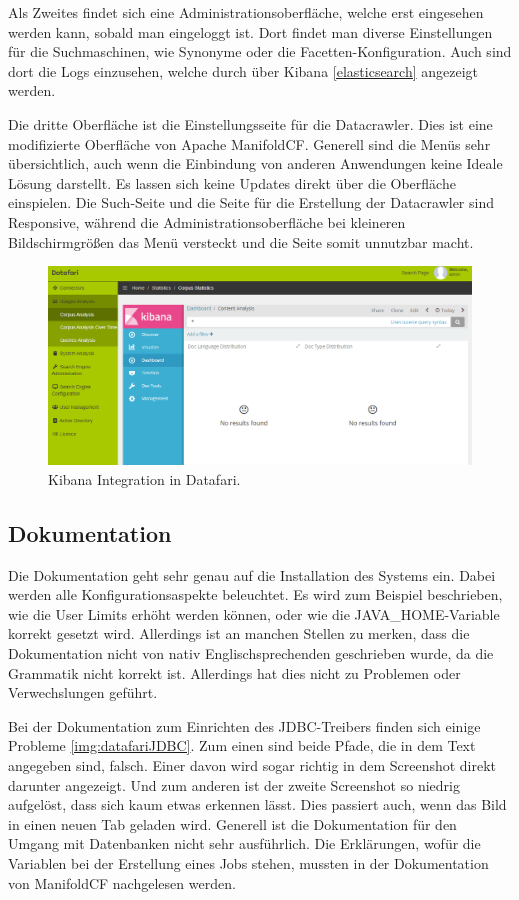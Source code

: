 Als Zweites findet sich eine Administrationsoberfläche, welche erst eingesehen werden kann, sobald man eingeloggt ist. Dort findet man diverse Einstellungen für die Suchmaschinen, wie Synonyme oder die Facetten-Konfiguration. Auch sind dort die Logs einzusehen, welche durch über Kibana \ref{elasticsearch} angezeigt werden. 

Die dritte Oberfläche ist die Einstellungsseite für die Datacrawler. Dies ist eine modifizierte Oberfläche von Apache ManifoldCF. Generell sind die Menüs sehr übersichtlich, auch wenn die Einbindung von anderen Anwendungen keine Ideale Lösung darstellt. Es lassen sich keine Updates direkt über die Oberfläche einspielen.
Die Such-Seite und die Seite für die Erstellung der Datacrawler sind Responsive, während die Administrationsoberfläche bei kleineren Bildschirmgrößen das Menü versteckt und die Seite somit unnutzbar macht.

\begin{figure}
	\centering
	\includegraphics[width=1\linewidth]{images/datafari_kibana.png}
	\caption{Kibana Integration in Datafari.}
	\label{img:datafariKibana}
\end{figure}

\subsection{Dokumentation}

Die Dokumentation geht sehr genau auf die Installation des Systems ein. Dabei werden alle Konfigurationsaspekte beleuchtet. Es wird zum Beispiel beschrieben, wie die User Limits erhöht werden können, oder wie die JAVA\_HOME-Variable korrekt gesetzt wird. Allerdings ist an manchen Stellen zu merken, dass die Dokumentation nicht von nativ Englischsprechenden geschrieben wurde, da die Grammatik nicht korrekt ist. Allerdings hat dies nicht zu Problemen oder Verwechslungen geführt.

Bei der Dokumentation zum Einrichten des JDBC-Treibers finden sich einige Probleme \ref{img:datafariJDBC}. Zum einen sind beide Pfade, die in dem Text angegeben sind, falsch. Einer davon wird sogar richtig in dem Screenshot direkt darunter angezeigt. Und zum anderen ist der zweite Screenshot so niedrig aufgelöst, dass sich kaum etwas erkennen lässt. Dies passiert auch, wenn das Bild in einen neuen Tab geladen wird. Generell ist die Dokumentation für den Umgang mit Datenbanken nicht sehr ausführlich. Die Erklärungen, wofür die Variablen bei der Erstellung eines Jobs stehen, mussten in der Dokumentation von ManifoldCF nachgelesen werden.


